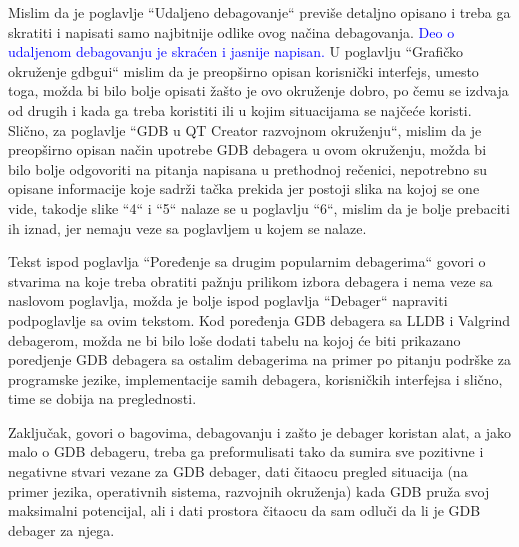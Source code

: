 \documentclass[a4paper]{report}
\newcommand{\odgovor}[1]{\textcolor{blue}{#1}}
\begin{document}
Mislim da je poglavlje ``Udaljeno debagovanje`` previše detaljno opisano i treba ga skratiti i napisati samo najbitnije odlike ovog načina debagovanja. \odgovor{Deo o udaljenom debagovanju je skraćen i jasnije napisan.} U poglavlju ``Grafičko okruženje gdbgui`` mislim da je preopširno opisan korisnički interfejs, umesto toga, možda bi bilo bolje opisati žašto je ovo okruženje dobro, po čemu se izdvaja od drugih i kada ga treba koristiti ili u kojim situacijama se najčeće koristi. Slično, za poglavlje ``GDB u QT Creator razvojnom okruženju``, mislim da je preopširno opisan način upotrebe GDB debagera u ovom okruženju, možda bi bilo bolje odgovoriti na pitanja napisana u prethodnoj rečenici, nepotrebno su opisane informacije koje sadrži tačka prekida jer postoji slika na kojoj se one vide, takodje slike ``4`` i ``5`` nalaze se u poglavlju ``6``, mislim da je bolje prebaciti ih iznad, jer nemaju veze sa poglavljem u kojem se nalaze.

Tekst ispod poglavlja ``Poređenje sa drugim popularnim debagerima`` govori o stvarima na koje treba obratiti pažnju prilikom izbora debagera i nema veze sa naslovom poglavlja, možda je bolje ispod poglavlja ``Debager`` napraviti podpoglavlje sa ovim tekstom. Kod poređenja GDB debagera sa LLDB i Valgrind debagerom, možda ne bi bilo loše dodati tabelu na kojoj će biti prikazano poredjenje GDB debagera sa ostalim debagerima na primer po pitanju podrške za programske jezike, implementacije samih debagera, korisničkih interfejsa i slično, time se dobija na preglednosti. 

Zaključak, govori o bagovima, debagovanju i zašto je debager koristan alat, a jako malo o GDB debageru, treba ga preformulisati tako da sumira sve pozitivne i negativne stvari vezane za GDB debager, dati čitaocu pregled situacija (na primer jezika, operativnih sistema, razvojnih okruženja) kada GDB pruža svoj maksimalni potencijal, ali i dati prostora čitaocu da sam odluči da li je GDB debager za njega.
\end{document}
